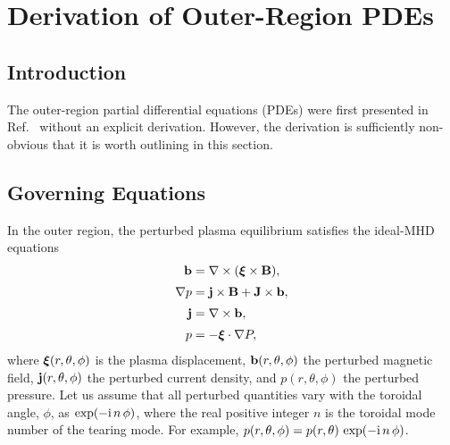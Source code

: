 \documentclass[12pt,prb,aps]{revtex4-1}
\newcommand {\bxi}{\mbox{\boldmath$\xi$}}
\begin{document}
\section{Derivation of Outer-Region PDEs}\label{opde}
\subsection{Introduction}
The outer-region partial differential equations (PDEs) were first presented in Ref.~ without an explicit
derivation. However, the derivation is sufficiently non-obvious that it is worth outlining in this section. 

\subsection{Governing Equations}\label{mhd}
In the outer region, the perturbed plasma equilibrium satisfies the  ideal-MHD equations\,\cite{connor,am1,am3,gs1}
\begin{align}
{\bf b} &= \nabla\times (\bxi\times {\bf B}),\label{e21}\\[0.5ex]
\nabla p &={\bf j}\times {\bf B}  +{\bf J}\times {\bf b},\label{e22}\\[0.5ex]
{\bf j} &= \nabla\times {\bf b},\label{e23}\\[0.5ex]
p&= -\bxi\cdot\nabla P,\label{e24}
\end{align}
where $\bxi(r,\theta,\phi)$ is the plasma displacement, ${\bf b}(r,\theta,\phi)$ the perturbed magnetic field,
${\bf j}(r,\theta,\phi)$ the perturbed current density, and $p(r,\theta,\phi)$ the perturbed pressure. 
Let us assume that all perturbed quantities vary with the toroidal angle, $\phi$, as $\exp(-{\rm i}\,n\,\phi)$, where the real positive integer $n$ is the
toroidal mode number of the tearing mode. For example, $p(r,\theta,\phi) = p(r,\theta)\,\exp(-{\rm i}\,n\,\phi)$. 
\end{document}
